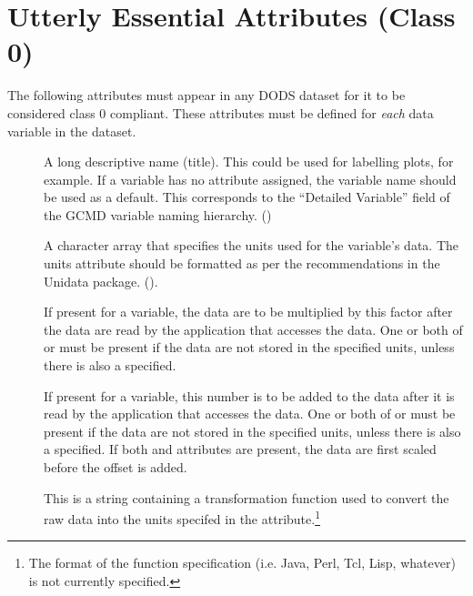 \section{Utterly Essential Attributes (Class 0)}

The following attributes must appear in any DODS dataset for it to be
considered class 0 compliant.  These attributes must be defined for
\emph{each} data variable in the dataset.

\begin{description}

\item[] A long descriptive name (title). This could be
  used for labelling plots, for example. If a variable has no
   attribute assigned, the variable name should be
  used as a default.  This corresponds to the ``Detailed Variable''
  field of the GCMD variable naming hierarchy. 
  () 
  
\item[] A character array that specifies the units used for
  the variable's data. The units attribute should be formatted as per
  the recommendations in the Unidata
  package. ().
  
\item[] If present for a variable, the data are to
  be multiplied by this factor after the data are read by the
  application that accesses the data. One or both of  or
   must be present if the data are not stored in the
  specified units, unless there is also a  specified.
  
\item[] If present for a variable, this number is to
  be added to the data after it is read by the application that
  accesses the data.  One or both of  or
   must be present if the data are not stored in the
  specified units, unless there is also a  specified.
  If both  and  attributes are
  present, the data are first scaled before the offset is added.
  
\item[] This is a string containing a transformation
  function used to convert the raw data into the units specifed in the
   attribute.\footnote{The format of the function
    specification (i.e. Java, Perl, Tcl, Lisp, whatever) is not
    currently specified.}

\end{description}

